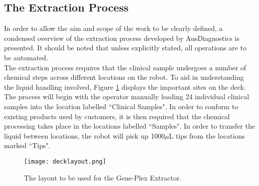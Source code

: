 \subsection{The Extraction Process}
\label{subsec:intro_extraction}

In order to allow the aim and scope of the work to be clearly defined, a condensed overview of the extraction process developed by AusDiagnostics is presented. It should be noted that unless explicitly stated, all operations are to be automated.\\

The extraction process requires that the clinical sample undergoes a number of chemical steps across different locations on the robot. To aid in understanding the liquid handling involved, Figure \ref{fig:decklayout} displays the important sites on the deck. The process will begin with the operator manually loading 24 individual clinical samples into the location labelled ``Clinical Samples". In order to conform to existing products used by customers, it is then required that the chemical processing takes place in the locations labelled ``Samples". In order to transfer the liquid between locations, the robot will pick up 1000$\mu$L tips from the locations marked ``Tips".\\

\begin{figure}[!htb]
	\centering
	\texttt{[image: decklayout.png]}
	\caption[Extractor deck layout.]{The layout to be used for the Gene-Plex Extractor.}
	\label{fig:decklayout}
\end{figure} 
\FloatBarrier

